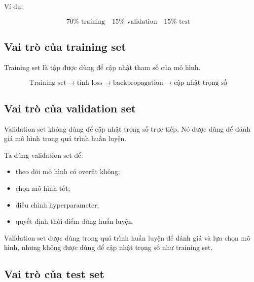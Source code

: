 Ví dụ:

\[
    70\% \text{ training}
    \quad
    15\% \text{ validation}
    \quad
    15\% \text{ test}
\]

\begin{center}
\end{center}

\subsection{Vai trò của training set}

Training set là tập được dùng để cập nhật tham số của mô hình.

\[
    \text{Training set}
    \rightarrow
    \text{tính loss}
    \rightarrow
    \text{backpropagation}
    \rightarrow
    \text{cập nhật trọng số}
\]

\subsection{Vai trò của validation set}

Validation set không dùng để cập nhật trọng số trực tiếp. Nó được dùng để đánh giá mô hình trong quá trình huấn luyện.

Ta dùng validation set để:

\begin{itemize}
    \item theo dõi mô hình có overfit không;
    \item chọn mô hình tốt;
    \item điều chỉnh hyperparameter;
    \item quyết định thời điểm dừng huấn luyện.
\end{itemize}

\begin{ghinho}
Validation set được dùng trong quá trình huấn luyện để đánh giá và lựa chọn mô hình, nhưng không được dùng để cập nhật trọng số như training set.
\end{ghinho}

\subsection{Vai trò của test set}

